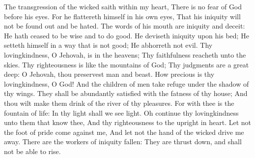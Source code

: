 
The transgression of the wicked saith within my heart, There is no fear of God before his eyes.  For he flattereth himself in his own eyes, That his iniquity will not be found out and be hated.  The words of his mouth are iniquity and deceit: He hath ceased to be wise and to do good.  He deviseth iniquity upon his bed; He setteth himself in a way that is not good; He abhorreth not evil.  Thy lovingkindness, O Jehovah, is in the heavens; Thy faithfulness reacheth unto the skies.  Thy righteousness is like the mountains of God; Thy judgments are a great deep: O Jehovah, thou preservest man and beast.  How precious is thy lovingkindness, O God! And the children of men take refuge under the shadow of thy wings.  They shall be abundantly satisfied with the fatness of thy house; And thou wilt make them drink of the river of thy pleasures.  For with thee is the fountain of life: In thy light shall we see light.  Oh continue thy lovingkindness unto them that know thee, And thy righteousness to the upright in heart.  Let not the foot of pride come against me, And let not the hand of the wicked drive me away.  There are the workers of iniquity fallen: They are thrust down, and shall not be able to rise. 

